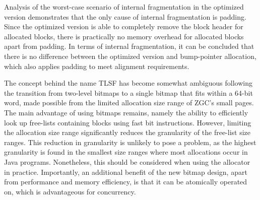 Analysis of the worst-case scenario of internal fragmentation in the optimized version demonstrates that the only cause of internal fragmentation is padding. Since the optimized version is able to completely remove the block header for allocated blocks, there is practically no memory overhead for allocated blocks apart from padding. In terms of internal fragmentation, it can be concluded that there is no difference between the optimized version and bump-pointer allocation, which also applies padding to meet alignment requirements.

The concept behind the name TLSF has become somewhat ambiguous following the transition from two-level bitmaps to a single bitmap that fits within a 64-bit word, made possible from the limited allocation size range of ZGC's small pages. The main advantage of using bitmaps remains, namely the ability to efficiently look up free-lists containing blocks using fast bit instructions. However, limiting the allocation size range significantly reduces the granularity of the free-list size ranges. This reduction in granularity is unlikely to pose a problem, as the highest granularity is found in the smallest size ranges where most allocations occur in Java programs. Nonetheless, this should be considered when using the allocator in practice. Importantly, an additional benefit of the new bitmap design, apart from performance and memory efficiency, is that it can be atomically operated on, which is advantageous for concurrency.

